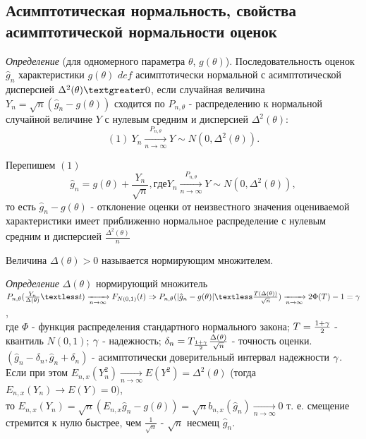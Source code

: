 \subsection{Асимптотическая нормальность, свойства асимптотической нормальности оценок}

\textit{Определение} (для одномерного параметра $\theta$, $g(\theta)$).
Последовательность оценок $\hat{g}_n$ характеристики $g(\theta)$ $def$ асимптотически нормальной с асимптотической дисперсией $\Delta^2(\theta) \textgreater 0$, если случайная величина $Y_n = \sqrt{n}(\hat{g}_n - g(\theta))$ сходится по $P_{n, \theta}$ - распределению к нормальной случайной величине $Y$ с нулевым средним и дисперсией $\Delta^2(\theta)$:
\[
  (1)~ Y_n \xrightarrow[n \to \infty]{P_{n, \theta}} Y \sim N(0, \Delta^2(\theta))
.\]

Перепишем $(1)$
\[
  \hat{g}_n = g(\theta) + \frac{Y_n}{\sqrt{n}}, где Y_n \xrightarrow[n \to \infty]{P_{n, \theta}} Y \sim N(0, \Delta^2(\theta))
,\] то есть
$\hat{g}_n - g(\theta)$ - отклонение оценки от неизвестного значения оцениваемой характеристики имеет приближенно нормальное распределение с нулевым средним и дисперсией $\frac{\Delta^2(\theta)}{n}$

\begin{definition}
  Величина $\Delta(\theta) > 0$ называется нормирующим множителем.
\end{definition}

\textit{Определение} $\Delta(\theta)$ нормирующий множитель \\
$P_{n, \theta}(\frac{Y_n}{\Delta(\theta)} \textless t) \xrightarrow[n \to \infty]{} F_{N(0, 1)}(t) \Rightarrow{} P_{n, \theta}(|\hat{g}_n - g(\theta)| \textless \frac{T(\Delta(\theta))} {\sqrt{n}}) \xrightarrow[n \to \infty]{} 2\Phi(T) - 1 = \g$, \\
где $\Phi$ - функция распределения стандартного нормального закона; $T = \frac{1 + \gamma}{2}$ - квантиль $N(0, 1)$;
$\gamma$ - надежность; $\delta_n = T_{\frac{1 + \gamma}{2}}\frac{\Delta(\theta)}{\sqrt{n}}$ - точность оценки. \\
$(\hat{g}_n - \delta_n, \hat{g}_n + \delta_n)$ - асимптотически доверительный интервал надежности $\gamma$. \\
Если при этом $E_{n, x}(Y_n^2) \xrightarrow[n \to \infty]{} E(Y^2) = \Delta^2(\theta)$ (тогда $E_{n, x}(Y_n) \xrightarrow[]{} E(Y) = 0)$, \\
то $E_{n, x}(Y_n) = \sqrt{n}(E_{n, x}\hat{g}_n - g(\theta))
 = \sqrt{n}b_{n, x}(\hat{g}_n) \xrightarrow[n \to \infty]{} 0$
 т. е. смещение стремится к нулю быстрее, чем $\frac{1}{\sqrt{n}}$
- $\sqrt{n}$ несмещ $\hat{g}_n$.

